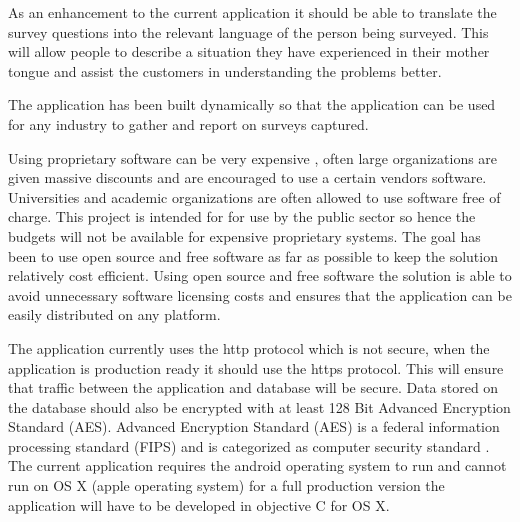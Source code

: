\documentclass[12pt]{witseiepaper}
\begin{document}
As an enhancement to the current application it should be able to translate the survey questions into the relevant language of the person being surveyed. This will allow people to describe a situation they have experienced in their mother tongue and assist the customers in understanding the problems better.

The application has been built dynamically so that the application can be used for any industry to gather and report on surveys captured. 

Using proprietary software can be very expensive , often large organizations are given massive discounts and are encouraged to use a certain vendors software. Universities and academic organizations are often allowed to use software free of charge.
This project is intended for for use by the public sector so hence the budgets will not be available for expensive proprietary systems. The goal has been to use open source and free software as far as possible to keep the solution relatively cost efficient. Using open source and free software the solution is able to avoid unnecessary software licensing costs and ensures that the application can be easily distributed on any platform.

The application currently uses the http protocol which is not secure, when the application is production ready it should use the https protocol. This will ensure that traffic between the application and database will be secure. 
Data stored on the database should also be encrypted with at least 128 Bit Advanced Encryption Standard (AES). Advanced Encryption Standard (AES) is a federal information processing standard (FIPS) and is categorized as computer security standard \cite{AES}. 
The current application requires the android operating system to run and cannot run on OS X (apple operating system) for a full production version the application will have to be developed in objective C for OS X. 






\end{document}
